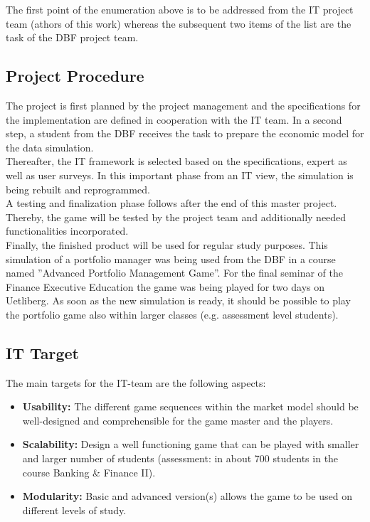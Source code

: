 The first point of the enumeration above is to be addressed from the IT project team (athors of this work) whereas the subsequent two items of the list are the task of the DBF project team.


\subsection{Project Procedure}

The project is first planned by the project management and the specifications for the implementation are defined in cooperation with the IT team. In a second step, a student from the DBF receives the task to prepare the economic model for the data simulation.\\

Thereafter, the IT framework is selected based on the specifications, expert as well as user surveys. In this important phase from an IT view, the simulation is being rebuilt and reprogrammed.\\

A testing and finalization phase follows after the end of this master project. Thereby, the game will be tested by the project team and additionally needed functionalities incorporated.\\

Finally, the finished product will be used for regular study purposes. This simulation of a portfolio manager was being used from the DBF in a course named ''Advanced Portfolio Management Game''. For the final seminar of the Finance Executive Education the game was being played for two days on Uetliberg. As soon as the new simulation is ready, it should be possible to play the portfolio game also within larger classes (e.g. assessment level students).


\subsection{IT Target}
The main targets for the IT-team are the following aspects:
\begin{itemize}
  \item \textbf{Usability:} The different game sequences within the market model should be well-designed and comprehensible for the game master and the players.
  \item \textbf{Scalability:} Design a well functioning game that can be played with smaller and larger number of students (assessment: in about 700 students in the course Banking & Finance II).
  \item \textbf{Modularity:} Basic and advanced version(s) allows the game to be used on different levels of study.
\end{itemize}


